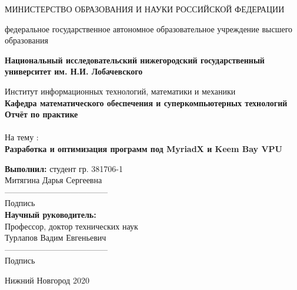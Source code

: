 \documentclass{article}
\begin{document}
    \begin{center} 
    \large МИНИСТЕРСТВО ОБРАЗОВАНИЯ И НАУКИ РОССИЙСКОЙ ФЕДЕРАЦИИ

федеральное государственное автономное образовательное учреждение высшего образования

\textbf{Национальный исследовательский нижегородский государственный университет им. Н.И. Лобачевского}

Институт информационных технологий, математики и механики \\
\textbf{Кафедра математического обеспечения и суперкомпьютерных технологий}\\[3.5cm] 
    
    \huge \textbf{Отчёт по практике} \\[0.6cm] %
    \\ 
    \huge{На тему :}\\[0.6cm]
    \huge \textbf{Разработка и оптимизация программ под MyriadX и Keem Bay VPU}\\[5.7cm]
    
    
    \end{center} 
    
    \begin{flushright}
    \large \textbf{Выполнил:} 
    студент гр. 381706-1 \\
    Митягина Дарья Сергеевна \\ [0.65cm]
    --------------------------------------\\
                                Подпись\\
    \textbf{Научный руководитель:} \\
    Профессор, доктор технических наук\\
    Турлапов Вадим Евгеньевич \\ [0.65cm]
    --------------------------------------\\
                                Подпись\\
    [3.2cm]
    \end{flushright}
    
    
    \begin{center} 
    \large Нижний Новгород 2020
    \end{center} 

    \newpage
      \begin{center}
      \end{center}
        \tableofcontents
      
\end{document}
